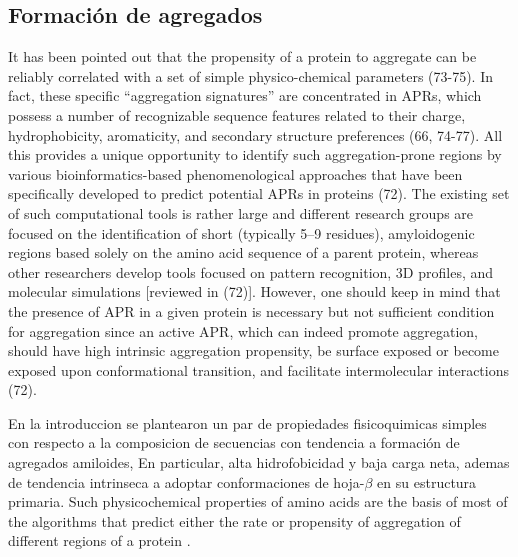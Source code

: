 \subsection{Formación de agregados}







% 
It has been pointed out that the propensity of a protein to aggregate can be reliably correlated with a set of simple
physico-chemical parameters (73-75). In fact, these specific “aggregation signatures” are concentrated in APRs, which possess a
number of recognizable sequence features related to their charge, hydrophobicity, aromaticity, and secondary structure
preferences (66, 74-77). All this provides a unique opportunity to identify such aggregation-prone regions by various
bioinformatics-based phenomenological approaches that have been specifically developed to predict potential APRs in proteins
(72). The existing set of such computational tools is rather large and different research groups are focused on the identification of
short (typically 5–9 residues), amyloidogenic regions based solely on the amino acid sequence of a parent protein, whereas other
researchers develop tools focused on pattern recognition, 3D profiles, and molecular simulations [reviewed in (72)]. However,
one should keep in mind that the presence of APR in a given protein is necessary but not sufficient condition for aggregation
since an active APR, which can indeed promote aggregation, should have high intrinsic aggregation propensity, be surface
exposed or become exposed upon conformational transition, and facilitate intermolecular interactions (72).


En la introduccion se plantearon un par de propiedades fisicoquimicas simples con respecto a la composicion de secuencias con tendencia a formación de agregados amiloides,
En particular, alta hidrofobicidad y baja carga neta, ademas de tendencia intrinseca a adoptar conformaciones de hoja-$\beta$ en su estructura primaria.
Such physicochemical properties of amino acids are the basis of most of the algorithms that predict either the rate or propensity of aggregation of different regions of a protein .  


